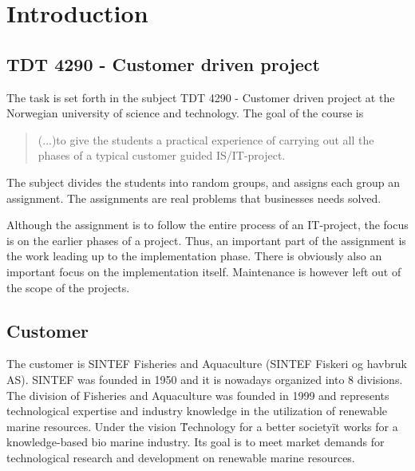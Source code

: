 \documentclass[11pt,a4paper,titlepage,oneside]{report}
\begin{document}
\tableofcontents
{}

\listoffigures
{}

\listoftables
{}

\setcounter{page}{0}


\chapter{Introduction}
\section{TDT 4290 - Customer driven project}
The task is set forth in the subject TDT 4290 - Customer driven project at the Norwegian university of science and technology. The goal of the course is 
\begin{quote}
(...)to give the students a practical experience of carrying out all the phases of a typical customer guided IS/IT-project. \cite{TDT4290:Intro}
\end{quote}
The subject divides the students into random groups, and assigns each group an assignment. The assignments are real problems that businesses needs solved. 

Although the assignment is to follow the entire process of an IT-project, the focus is on the earlier phases of a project. Thus, an important part of the assignment is the work leading up to the implementation phase. There is obviously also an important focus on the implementation itself. Maintenance is however left out of the scope of the projects.

\section{Customer}
The customer is SINTEF Fisheries and Aquaculture (SINTEF Fiskeri og havbruk AS). 
SINTEF was founded in 1950 and it is nowadays organized into 8 divisions. The division of Fisheries and Aquaculture was founded in 1999 and represents technological expertise and industry knowledge in the utilization of renewable marine resources. Under the vision \"Technology for a better society\" it works for a knowledge-based bio marine industry. Its goal is to meet market demands for technological research and development on renewable marine resources.
\end{document}
